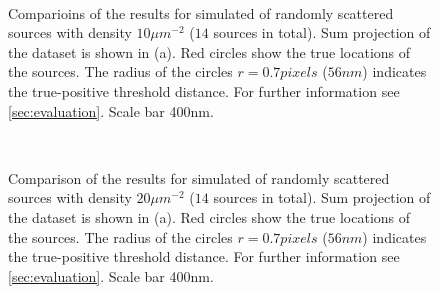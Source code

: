\begin{figure}[!h]
	\centering
	\newcommand{\sizef}{.95}
	\\
	\caption{Comparioins of the results for simulated of randomly scattered sources with density $10\unit{\mu m^{-2}}$ ($14$ sources in total). Sum projection of the dataset is shown in (a). Red circles show the true locations of the sources. The radius of the circles $r=0.7\unit{pixels}$ ($56\unit{nm}$) indicates the true-positive threshold distance. For further information see \autoref{sec:evaluation}. Scale bar 400\unit{nm}.}
	\label{fig:comparison density 10}
\end{figure}

\begin{figure}[!h]
	\centering
	\newcommand{\sizef}{.95}
	\\
	\caption{Comparison of the results for simulated of randomly scattered sources with density $20\unit{\mu m^{-2}}$ ($14$ sources in total). Sum projection of the dataset is shown in (a). Red circles show the true locations of the sources. The radius of the circles $r=0.7\unit{pixels}$ ($56\unit{nm}$) indicates the true-positive threshold distance. For further information see \autoref{sec:evaluation}. Scale bar 400\unit{nm}.}
	\label{fig:comparison density 20}
\end{figure}

